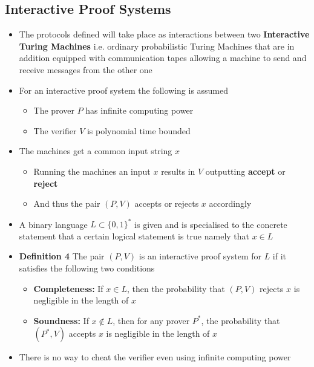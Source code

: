 \subsection{Interactive Proof Systems}
\begin{itemize}
  \item The protocols defined will take place as interactions between two \textbf{Interactive Turing Machines} i.e. ordinary probabilistic Turing Machines that are in addition equipped with communication tapes allowing a machine to send and receive messages from the other one
  \item For an interactive proof system the following is assumed
  \begin{itemize}
  	\item The prover $P$ has infinite computing power
  	\item The verifier $V$ is polynomial time bounded
  \end{itemize}
  \item The machines get a common input string $x$
  \begin{itemize}
  	\item Running the machines an input $x$ results in $V$ outputting \textbf{accept} or \textbf{reject}
  	\item And thus the pair $(P,V)$ accepts or rejects $x$ accordingly
  \end{itemize}
  \item A binary language $L \subset \{0,1\}^*$ is given and is specialised to the concrete statement that a certain logical statement is true namely that $x \in L$
  \item \textbf{Definition 4} The pair $(P,V)$ is an interactive proof system for $L$ if it satisfies the following two conditions
  \begin{itemize}
  	\item \textbf{Completeness:} If $x \in L$, then the probability that $(P,V)$ rejects $x$ is negligible in the length of $x$
  	\item \textbf{Soundness:} If $x \notin L$, then for any prover $P^*$, the probability that $(P^*,V)$ accepts $x$ is negligible in the length of $x$
  \end{itemize}
  \item There is no way to cheat the verifier even using infinite computing power
\end{itemize}

